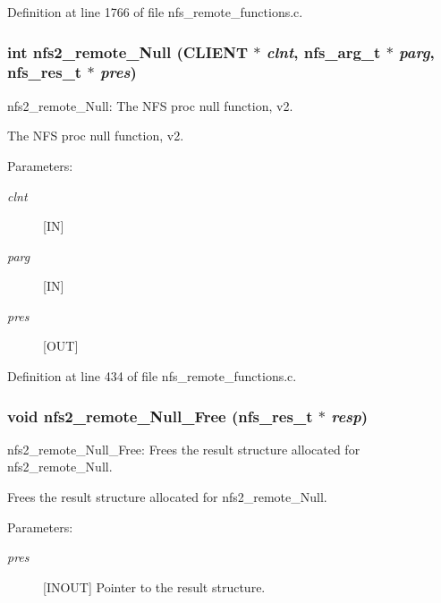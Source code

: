 Definition at line 1766 of file nfs\_\-remote\_\-functions.c.
\subsubsection[{nfs2\_\-remote\_\-Null}]{\setlength{\rightskip}{0pt plus 5cm}int nfs2\_\-remote\_\-Null (CLIENT $\ast$ {\em clnt}, \/  nfs\_\-arg\_\-t $\ast$ {\em parg}, \/  nfs\_\-res\_\-t $\ast$ {\em pres})}\label{group__NFSprocs_gee0546d6aa6d2bc92b7ddd5df8929697}


nfs2\_\-remote\_\-Null: The NFS proc null function, v2.

The NFS proc null function, v2.

\begin{Desc}
\item[Parameters:]
\begin{description}
\item[{\em clnt}][IN] \item[{\em parg}][IN] \item[{\em pres}][OUT] \end{description}
\end{Desc}


Definition at line 434 of file nfs\_\-remote\_\-functions.c.
\subsubsection[{nfs2\_\-remote\_\-Null\_\-Free}]{\setlength{\rightskip}{0pt plus 5cm}void nfs2\_\-remote\_\-Null\_\-Free (nfs\_\-res\_\-t $\ast$ {\em resp})}\label{group__NFSprocs_gce5aab21fc47e074e47d52bcf8f2457b}


nfs2\_\-remote\_\-Null\_\-Free: Frees the result structure allocated for nfs2\_\-remote\_\-Null.

Frees the result structure allocated for nfs2\_\-remote\_\-Null.

\begin{Desc}
\item[Parameters:]
\begin{description}
\item[{\em pres}][INOUT] Pointer to the result structure. \end{description}
\end{Desc}


